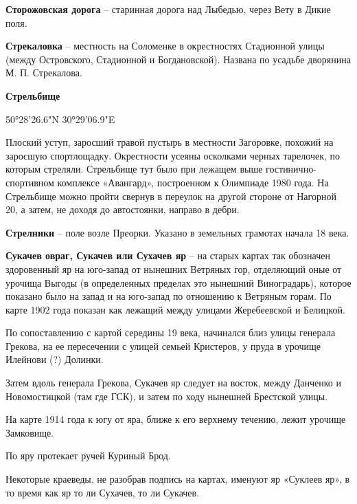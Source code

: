 \medskip

\textbf{Сторожовская дорога} – старинная дорога над Лыбедью, через Вету в Дикие поля.\\

\medskip

\textbf{Стрекаловка} – местность на Соломенке в окрестностях Стадионной улицы (между Островского, Стадионной и Богдановской). Названа по усадьбе дворянина М. П. Стрекалова.\\

\medskip

\textbf{Стрельбище}

50°28'26.6"N 30°29'06.9"E

Плоский уступ, заросший травой пустырь в местности Загоровке, похожий на заросшую спортлощадку. Окрестности усеяны осколками черных тарелочек, по которым стреляли. Стрельбище тут было при лежащем выше  гости\-нично-спортивном комплексе «Авангард», построенном к Олимпиаде 1980 года. На Стрельбище можно пройти свернув в переулок на другой стороне от Нагорной 20, а затем, не доходя до автостоянки, направо в дебри.\\

\medskip

\textbf{Стрелники} – поле возле Преорки. Указано в земельных грамотах начала 18 века.\\

\medskip

\textbf{Сукачев овраг, Сукачев или Сухачев яр} – на старых картах так обозначен здоровенный яр на юго-запад от нынешних Ветряных гор, отделяющий оные от урочища Выгоды (в определенных пределах это нынешний Виноградарь), которое показано было на запад и на юго-запад по отношению к Ветряным горам. По карте 1902 года показан как лежащий между улицами Жеребеевской и Белицкой.

По сопоставлению с картой середины 19 века, начинался близ улицы генерала Грекова, на ее пересечении с улицей семьей Кристеров, у пруда в урочище Илейнови (?) Долинки.

Затем вдоль генерала Грекова, Сукачев яр следует на восток, между Данченко и Новомостицкой (там где ГСК), и затем по ходу нынешней Брестской улицы.

На карте 1914 года к югу от яра, ближе к его верхнему течению, лежит урочище Замковище.

По яру протекает ручей Куриный Брод.

Некоторые краеведы, не разобрав подпись на картах, именуют яр «Суклеев яр», в то время как яр то ли Сухачев, то ли Сукачев.\\

